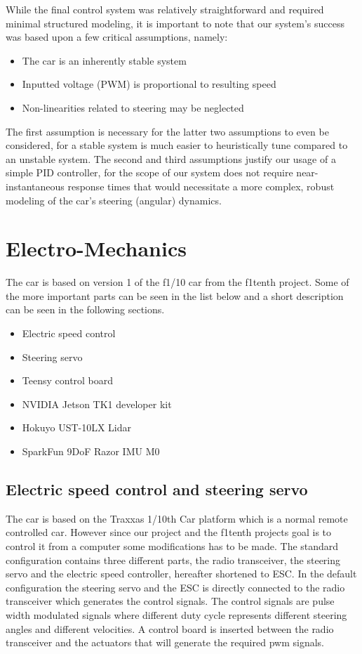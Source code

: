 \documentclass{LTHtwocol} %
\begin{document}
While the final control system was relatively straightforward and required minimal structured modeling, it is important to note that our system's success was based upon a few critical assumptions, namely:

\begin{itemize}
	\item The car is an inherently stable system
	\item Inputted voltage (PWM) is proportional to resulting speed
	\item Non-linearities related to steering may be neglected
\end{itemize}

The first assumption is necessary for the latter two assumptions to even be considered, for a stable system is much easier to heuristically tune compared to an unstable system. The second and third assumptions justify our usage of a simple PID controller, for the scope of our system does not require near-instantaneous response times that would necessitate a more complex, robust modeling of the car's steering (angular) dynamics.

\section{Electro-Mechanics}
The car is based on version 1 of the f1/10 car from the f1tenth project. Some of the more important parts can be seen in the list below and a short description can be seen in the following sections.


\begin{itemize}
	\item Electric speed control
	\item Steering servo
	\item Teensy control board
	\item NVIDIA Jetson TK1 developer kit
	\item Hokuyo UST-10LX Lidar
	\item SparkFun 9DoF Razor IMU M0
\end{itemize}

\subsection{Electric speed control and steering servo}
The car is based on the Traxxas 1/10th Car platform which is a normal remote controlled car. However since our project and the f1tenth projects goal is to control it from a computer some modifications has to be made. The standard configuration contains three different parts, the radio transceiver, the steering servo and the electric speed controller, hereafter shortened to ESC. In the default configuration the steering servo and the ESC is directly connected to the radio transceiver which generates the control signals. The control signals are pulse width modulated signals where different duty cycle represents different steering angles and different velocities. A control board is inserted between the radio transceiver and the actuators that will generate the required pwm signals.
\end{document}

